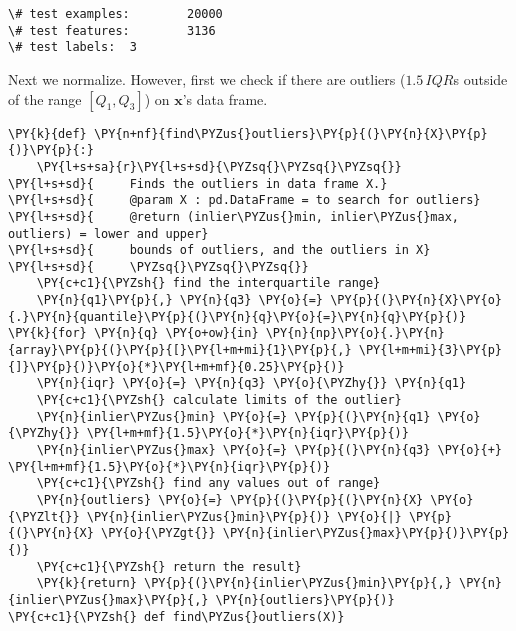     \begin{Verbatim}[commandchars=\\\{\}]
\# test examples:        20000
\# test features:        3136
\# test labels:  3
    \end{Verbatim}

    Next we normalize. However, first we check if there are outliers
(\(1.5\,I\!Q\!R\)s outside of the range \([Q_1, Q_3]\)) on
\(\mathbf{x}\)'s data frame.

    \begin{tcolorbox}[breakable, size=fbox, boxrule=1pt, pad at break*=1mm,colback=cellbackground, colframe=cellborder]
\begin{Verbatim}[commandchars=\\\{\}]
\PY{k}{def} \PY{n+nf}{find\PYZus{}outliers}\PY{p}{(}\PY{n}{X}\PY{p}{)}\PY{p}{:}
    \PY{l+s+sa}{r}\PY{l+s+sd}{\PYZsq{}\PYZsq{}\PYZsq{}}
\PY{l+s+sd}{     Finds the outliers in data frame X.}
\PY{l+s+sd}{     @param X : pd.DataFrame = to search for outliers}
\PY{l+s+sd}{     @return (inlier\PYZus{}min, inlier\PYZus{}max, outliers) = lower and upper}
\PY{l+s+sd}{     bounds of outliers, and the outliers in X}
\PY{l+s+sd}{     \PYZsq{}\PYZsq{}\PYZsq{}}
    \PY{c+c1}{\PYZsh{} find the interquartile range}
    \PY{n}{q1}\PY{p}{,} \PY{n}{q3} \PY{o}{=} \PY{p}{(}\PY{n}{X}\PY{o}{.}\PY{n}{quantile}\PY{p}{(}\PY{n}{q}\PY{o}{=}\PY{n}{q}\PY{p}{)} \PY{k}{for} \PY{n}{q} \PY{o+ow}{in} \PY{n}{np}\PY{o}{.}\PY{n}{array}\PY{p}{(}\PY{p}{[}\PY{l+m+mi}{1}\PY{p}{,} \PY{l+m+mi}{3}\PY{p}{]}\PY{p}{)}\PY{o}{*}\PY{l+m+mf}{0.25}\PY{p}{)}
    \PY{n}{iqr} \PY{o}{=} \PY{n}{q3} \PY{o}{\PYZhy{}} \PY{n}{q1}
    \PY{c+c1}{\PYZsh{} calculate limits of the outlier}
    \PY{n}{inlier\PYZus{}min} \PY{o}{=} \PY{p}{(}\PY{n}{q1} \PY{o}{\PYZhy{}} \PY{l+m+mf}{1.5}\PY{o}{*}\PY{n}{iqr}\PY{p}{)}
    \PY{n}{inlier\PYZus{}max} \PY{o}{=} \PY{p}{(}\PY{n}{q3} \PY{o}{+} \PY{l+m+mf}{1.5}\PY{o}{*}\PY{n}{iqr}\PY{p}{)}
    \PY{c+c1}{\PYZsh{} find any values out of range}
    \PY{n}{outliers} \PY{o}{=} \PY{p}{(}\PY{p}{(}\PY{n}{X} \PY{o}{\PYZlt{}} \PY{n}{inlier\PYZus{}min}\PY{p}{)} \PY{o}{|} \PY{p}{(}\PY{n}{X} \PY{o}{\PYZgt{}} \PY{n}{inlier\PYZus{}max}\PY{p}{)}\PY{p}{)}
    \PY{c+c1}{\PYZsh{} return the result}
    \PY{k}{return} \PY{p}{(}\PY{n}{inlier\PYZus{}min}\PY{p}{,} \PY{n}{inlier\PYZus{}max}\PY{p}{,} \PY{n}{outliers}\PY{p}{)}
\PY{c+c1}{\PYZsh{} def find\PYZus{}outliers(X)}
\end{Verbatim}
\end{tcolorbox}

